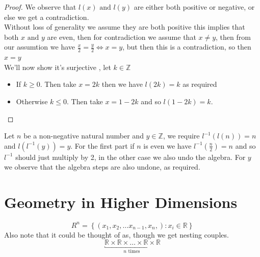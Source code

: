 \documentclass[11pt]{book}
\begin{document}
\begin{enumerate}
\begin{proof}
        We observe that $l\left(x\right) \text{ and } l\left(y\right) $ are either both positive or negative, or else we get a contradiction. \\
        Without loss of generality we assume they are both positive this implies that both $x \text{ and } y$ are even, then for contradiction we assume that $x \neq y$, then from our assumtion we have $\frac{x}{2}= \frac{y}{2} \Leftrightarrow x = y $, but then this is a contradiction, so then $x = y$ \\
        We'll now show it's surjective , let $k \in \mathbb{Z} $ 
        \begin{itemize}
            \item If $k \ge 0$. Then take $x= 2k$ then we have $l\left(2k\right) = k $ as required
            \item Otherwise $k \le 0$. Then take $x = 1 - 2k$ and so $l\left(1 - 2k\right) = k$. 
        \end{itemize}
        \end{proof}
        Let $n$ be a non-negative natural number and $y \in  \mathbb{Z} $, we require $l^{-1} \left(l\left(n\right) \right) = n$ and $  l\left(l^{-1} \left(y\right) \right) = y$. For the first part if $n$ is even we have $l^{-1} \left(\frac{n}{2}\right) = n$ and so $l^{-1} $ should just multiply by 2, in the other case we also undo the algebra. For $y$ we observe that the algebra steps are also undone, as required.
\end{enumerate}

\newpage


\section{Geometry in Higher Dimensions}%
\label{sec:geometry_in_higher_dimensions}

\begin{defn}[$R^{n} $ ]\label{defn:_r_n_}
    \[
        R^{n} = \left\{ \left( x_{1},  x_{2},  \dotsc   x_{n - 1},  x_{n},  \right): x_{i} \in \mathbb{R}   \right\} 
    \]
    Also note that it could be thought of as, though we get nesting couples.
    \[
        \underbracket{ \mathbb{R} \times \mathbb{R} \times \ldots \times \mathbb{R} \times \mathbb{R} }_{n \text{ times } }
    \]
\end{defn}
\end{document}

